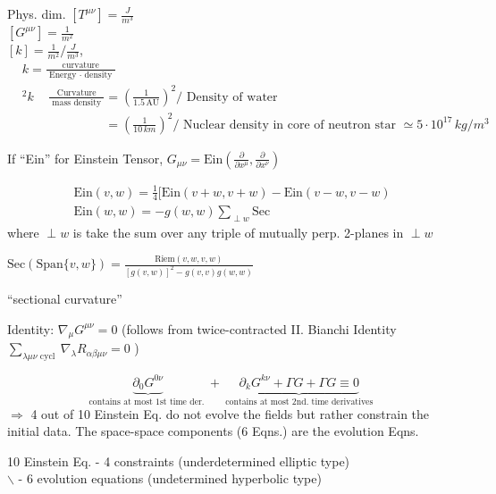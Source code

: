 \documentclass[10pt]{amsart}
\begin{document}
\begin{multicols*}{2}
	Phys. dim. $[T^{\mu \nu}] = \frac{J}{m^3} $ \\
	\phantom{Phys. dim} $[G^{\mu \nu}] = \frac{1}{m^2}$ \\
	\phantom{Phys. dim} $[k] = \frac{1}{m^2}/ \frac{J}{m^3}$, $\begin{aligned} & k = \frac{ \text{ curvature }}{ \text{ Energy } \cdot \text{ density }} \\
	& ^2 k  \quad \, \frac{ \text{ Curvature } }{ \text{ mass density }} = \left( \frac{1}{1.5 \, \text{AU} } \right)^2/ \text{ Density of water } \\
	& \phantom{^2 k  \quad \, \frac{ \text{ Curvature } }{ \text{ mass density }}} = \left( \frac{1}{ 10 \, km} \right)^2 / \text{ Nuclear density in core of neutron star  } \simeq 5 \cdot 10^{17} \, kg/m^3 \end{aligned}$
	
	If ``Ein'' for Einstein Tensor, $G_{\mu \nu} = \text{Ein}\left( \frac{ \partial }{ \partial x^{\mu }}, \frac{ \partial }{ \partial x^{\nu }} \right)$
	
	\[
	\begin{gathered}
	\text{Ein}(v,w) = \frac{1}{4} [ \text{Ein}(v+w,v+w) - \text{Ein}(v-w,v-w)  \\
	\text{Ein}(w,w) = -g(w,w) \sum_{\perp w } \text{Sec}
	\end{gathered}
	\]
	where $\perp w$ is take the sum over any triple of mutually perp. 2-planes in $\perp w$
	
	$\text{Sec}(\text{Span}\lbrace v,w \rbrace) = \frac{ \text{Riem}(v,w,v,w) }{ [g(v,w)]^2 - g(v,v)g(w,w) }$
	
	``sectional curvature''
	
	Identity: $\nabla_{\mu} G^{\mu \nu} =0$ (follows from twice-contracted II. Bianchi Identity \\
	 $\sum_{\lambda \mu \nu \text{ cycl } } \nabla_{\lambda} R_{\alpha \beta \mu \nu } = 0 $ )
	
	\[
	\underbrace{ \partial_0 G^{0\nu} }_{\text{contains at most 1st time der. }} + \underbrace{ \partial_k G^{k\nu} + \Gamma G  + \Gamma G \equiv0 }_{\text{ contains at most 2nd. time derivatives }}
	\]
	$\Longrightarrow$ 4 out of 10 Einstein Eq. do not evolve the fields but rather constrain the initial data. The space-space components (6 Eqns.) are the evolution Eqns.  
	
	10 Einstein Eq. - 4 constraints (underdetermined elliptic type) \\
	\phantom{10 Einstein Eq.\quad \, } $\backslash$ - 6 evolution equations (undetermined hyperbolic type)
	

\end{multicols*}
\end{document}
